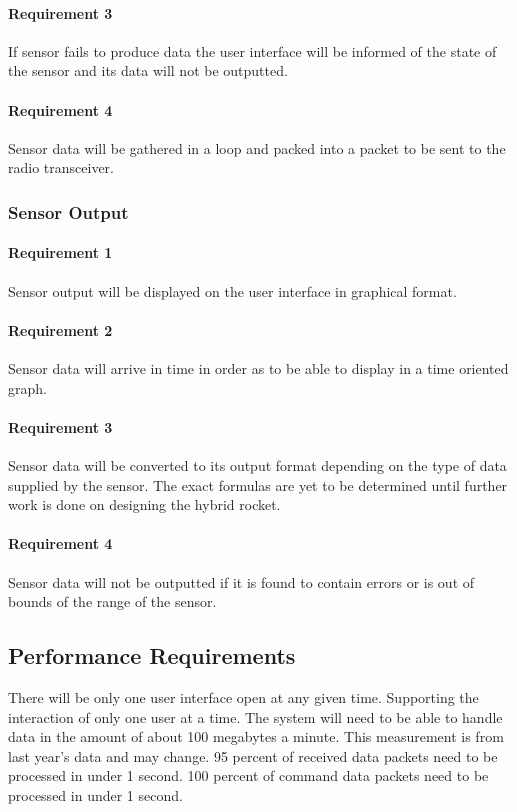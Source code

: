 \documentclass[10pt,draftclsnofoot,onecolumn,compsoc]{IEEEtran}
\begin{document}
	\paragraph{ Requirement 3}If sensor fails to produce data the user interface will be informed of the state of the sensor and its data will not be outputted.\par
	\paragraph{ Requirement 4}Sensor data will be gathered in a loop and packed into a packet to be sent to the radio transceiver.\par
\subsubsection{Sensor Output}
	\paragraph{ Requirement 1}Sensor output will be displayed on the user interface in graphical format.\par
	\paragraph{ Requirement 2}Sensor data will arrive in time in order as to be able to display in a time oriented graph.\par
	\paragraph{ Requirement 3}Sensor data will be converted to its output format depending on the type of data supplied by the sensor. The exact formulas are yet to be determined until further work is done on designing the hybrid rocket.\par
	\paragraph{ Requirement 4}Sensor data will not be outputted if it is found to contain errors or is out of bounds of the range of the sensor.\par

\subsection{ Performance Requirements}
There will be only one user interface open at any given time. Supporting the interaction of only one user at a time. The system will need to be able to handle data in the amount of about 100 megabytes a minute. This measurement is from last year's data and may change. 95 percent of received data packets need to be processed in under 1 second. 100 percent of command data packets need to be processed in under 1 second.
\end{document}

